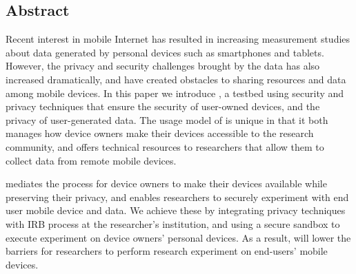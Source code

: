 \subsection*{Abstract}
Recent interest in mobile Internet has resulted in increasing measurement studies 
about data generated by personal devices such as smartphones and tablets. 
However, the privacy and security challenges brought by the data has also 
increased dramatically, and have created obstacles to 
sharing resources and data among mobile devices. In this paper we introduce \sysname, a testbed using 
security and privacy techniques that ensure the security of user-owned devices, and the 
privacy of user-generated data. The usage model of \sysname is unique in that 
it both manages how device owners make their devices accessible to the 
research community, and offers technical resources to researchers
that allow them to collect data from remote mobile devices. 

\sysname mediates the process for device owners to make 
their devices available while preserving their privacy, and enables 
researchers to securely experiment with end user mobile device and 
data. We achieve these by integrating privacy techniques with IRB 
process at the researcher's institution, and using a secure sandbox 
to execute experiment on device owners' personal devices. 
As a result, \sysname will lower the barriers for researchers to 
perform research experiment on end-users' mobile devices.